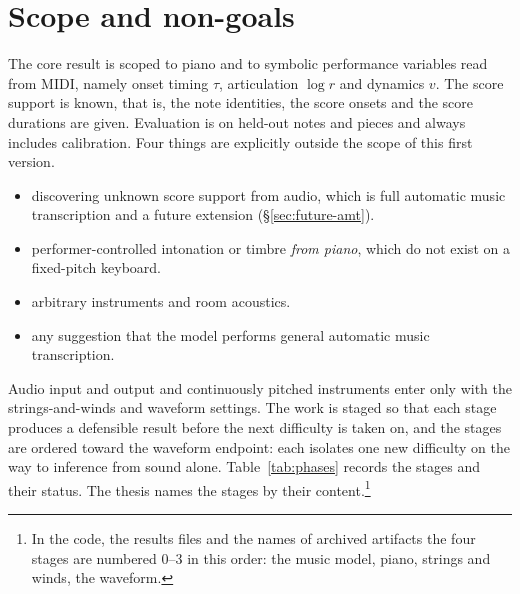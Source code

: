 \section{Scope and non-goals}\label{sec:scope}
The core result is scoped to piano and to symbolic performance variables
read from MIDI, namely onset timing $\tau$, articulation $\log r$ and
dynamics $v$. The score support is known, that is, the note identities,
the score onsets and the score durations are given. Evaluation is on
held-out notes and pieces and always includes calibration. Four things are
explicitly outside the scope of this first version.
\begin{itemize}[noitemsep]
  \item discovering unknown score support from audio, which is full
        automatic music transcription and a future extension
        (\S\ref{sec:future-amt}).
  \item performer-controlled intonation or timbre \emph{from piano}, which
        do not exist on a fixed-pitch keyboard.
  \item arbitrary instruments and room acoustics.
  \item any suggestion that the model performs general automatic music
        transcription.
\end{itemize}
Audio input and output and continuously pitched instruments enter only
with the strings-and-winds and waveform settings. The work is staged so
that each stage produces a defensible result before the next difficulty is
taken on, and the stages are ordered toward the waveform endpoint: each
isolates one new difficulty on the way to inference from sound alone.
Table~\ref{tab:phases} records the stages and their status. The thesis
names the stages by their content.\footnote{In the code, the results files
and the names of archived artifacts the four stages are numbered 0--3 in
this order: the music model, piano, strings and winds, the waveform.}

